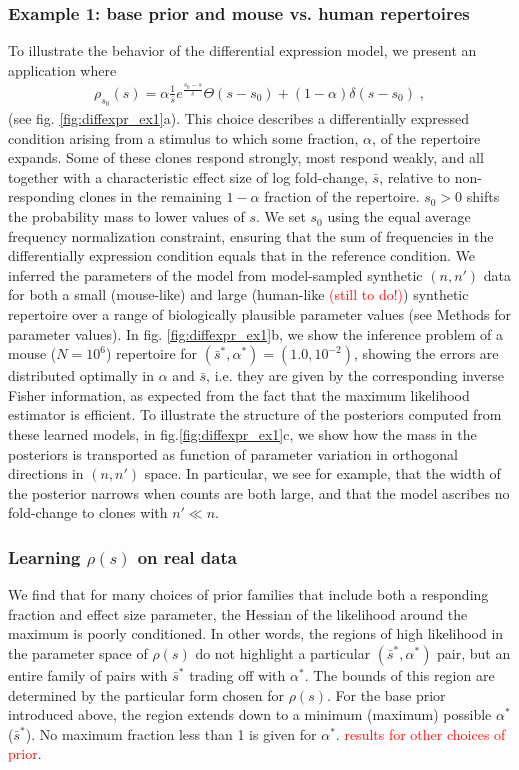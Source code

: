 \documentclass[letterpaper,english,prl,reprint,longbibliography]{revtex4-1} %
\newcommand{\re}[1]{\textcolor{red}{#1}}
\begin{document}
\subsubsection*{Example 1: base prior and mouse vs. human repertoires}
To illustrate the behavior of the differential expression model, we present an application where
\begin{align}
	\rho_{s_0}(s)=\alpha\frac{1}{\bar{s}}e^{\frac{s_0-s}{\bar{s}}} \Theta(s-s_0)+(1-\alpha)\delta(s-s_0)\;, \label{eq:Ps_ex1}
\end{align} 
(see fig. \ref{fig:diffexpr_ex1}a). 
This choice describes a differentially expressed condition arising from a stimulus to which some fraction, $\alpha$, of the repertoire expands. 
Some of these clones respond strongly, most respond weakly, and all together with a characteristic effect size of log fold-change, $\bar{s}$, relative to non-responding clones in the remaining $1-\alpha$ fraction of the repertoire. 
$s_0>0$ shifts the probability mass to lower values of $s$. 
We set $s_0$ using the equal average frequency normalization constraint, ensuring that the sum of frequencies in the differentially expression condition equals that in the reference condition.
We inferred the parameters of the model from model-sampled synthetic $(n,n')$ data for both a small (mouse-like) and large (human-like \textcolor{red}{(still to do!)}) synthetic repertoire over a range of biologically plausible parameter values (see Methods for parameter values). 
In fig. \ref{fig:diffexpr_ex1}b, we show the inference problem of a mouse ($N=10^{6}$) repertoire for $(\bar{s}^*,\alpha^* )=(1.0,10^{-2})$, showing the errors are distributed optimally in $\alpha$ and $\bar{s}$, i.e. they are given by the corresponding inverse Fisher information, as expected from the fact that the maximum likelihood estimator is efficient. To illustrate the structure of the posteriors computed from these learned models, in fig.\ref{fig:diffexpr_ex1}c, we show how the mass in the posteriors is transported as function of parameter variation in orthogonal directions in $(n,n')$ space. In particular, we see for example, that the width of the posterior narrows when counts are both large, and that the model ascribes no fold-change to clones with $n'\ll n$.

\subsubsection*{Learning $\rho(s)$ on real data}
We find that for many choices of prior families that include both a responding fraction and effect size parameter, the Hessian of the likelihood around the maximum is poorly conditioned. In other words, the regions of high likelihood in the parameter space of $\rho(s)$ do not highlight a particular $(\bar{s}^*,\alpha^*)$ pair, but an entire family of pairs with $\bar{s}^*$ trading off with $\alpha^*$. The bounds of this region are determined by the particular form chosen for $\rho(s)$. For the base prior introduced above, the region extends down to a minimum (maximum) possible $\alpha^*$ ($\bar{s}^*$). No maximum fraction less than 1 is given for $\alpha^*$. \re{results for other choices of prior}. 
\end{document}
